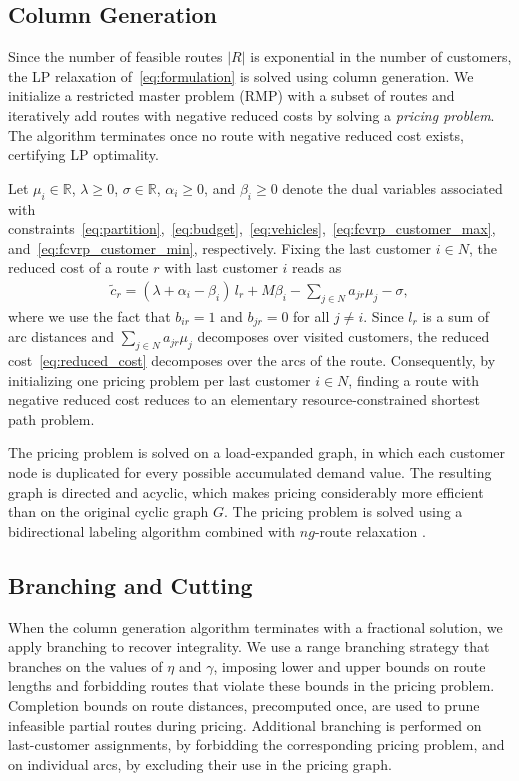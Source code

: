 \documentclass[a4paper,fleqn]{cas-dc}%
\begin{document}
\subsection{Column Generation}
\label{subsec:colgen}

Since the number of feasible routes $|R|$ is exponential in the number of customers, the LP relaxation of~\eqref{eq:formulation} is solved using column generation. We initialize a restricted master problem (RMP) with a subset of routes and iteratively add routes with negative reduced costs by solving a \emph{pricing problem}. The algorithm terminates once no route with negative reduced cost exists, certifying LP optimality.

Let $\mu_i \in \mathbb{R}$, $\lambda \geq 0$, $\sigma \in \mathbb{R}$, $\alpha_i \geq 0$, and $\beta_i \geq 0$ denote the dual variables associated with constraints~\eqref{eq:partition},~\eqref{eq:budget},~\eqref{eq:vehicles},~\eqref{eq:fcvrp_customer_max}, and~\eqref{eq:fcvrp_customer_min}, respectively. Fixing the last customer $i \in N$, the reduced cost of a route $r$ with last customer $i$ reads as
\begin{align}
    \tilde{c}_r = (\lambda + \alpha_i - \beta_i)\, l_r + M \beta_i - \sum_{j \in N} a_{jr} \mu_j - \sigma,
    \label{eq:reduced_cost}
\end{align}
where we use the fact that $b_{ir} = 1$ and $b_{jr} = 0$ for all $j \neq i$. Since $l_r$ is a sum of arc distances and $\sum_{j \in N} a_{jr} \mu_j$ decomposes over visited customers, the reduced cost~\eqref{eq:reduced_cost} decomposes over the arcs of the route. Consequently, by initializing one pricing problem per last customer $i \in N$, finding a route with negative reduced cost reduces to an elementary resource-constrained shortest path problem.

The pricing problem is solved on a load-expanded graph, in which each customer node is duplicated for every possible accumulated demand value. The resulting graph is directed and acyclic, which makes pricing considerably more efficient than on the original cyclic graph $G$. The pricing problem is solved using a bidirectional labeling algorithm combined with $ng$-route relaxation \citep{costa2019exact}.

\subsection{Branching and Cutting}
\label{subsec:branching}

When the column generation algorithm terminates with a fractional solution, we apply branching to recover integrality. We use a range branching strategy that branches on the values of $\eta$ and $\gamma$, imposing lower and upper bounds on route lengths and forbidding routes that violate these bounds in the pricing problem. Completion bounds on route distances, precomputed once, are used to prune infeasible partial routes during pricing. Additional branching is performed on last-customer assignments, by forbidding the corresponding pricing problem, and on individual arcs, by excluding their use in the pricing graph.
\end{document}
